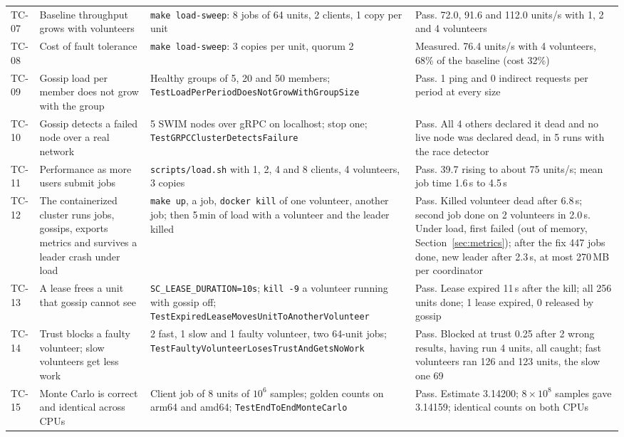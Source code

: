 \begin{table}[t]
\begin{tabular}{@{}lp{}p{}p{}@{}}
TC-07 & Baseline throughput grows with volunteers & \texttt{make load-sweep}: 8 jobs of 64 units, 2 clients, 1 copy per unit & Pass. 72.0, 91.6 and 112.0 units/s with 1, 2 and 4 volunteers \\
TC-08 & Cost of fault tolerance & \texttt{make load-sweep}: 3 copies per unit, quorum 2 & Measured. 76.4 units/s with 4 volunteers, 68\% of the baseline (cost 32\%) \\
TC-09 & Gossip load per member does not grow with the group & Healthy groups of 5, 20 and 50 members; \texttt{TestLoadPerPeriod\allowbreak DoesNotGrowWithGroupSize} & Pass. 1 ping and 0 indirect requests per period at every size \\
TC-10 & Gossip detects a failed node over a real network & 5 SWIM nodes over gRPC on localhost; stop one; \texttt{TestGRPCClusterDetectsFailure} & Pass. All 4 others declared it dead and no live node was declared dead, in 5 runs with the race detector \\
TC-11 & Performance as more users submit jobs & \texttt{scripts/load.sh} with 1, 2, 4 and 8 clients, 4 volunteers, 3 copies & Pass. 39.7 rising to about 75 units/s; mean job time 1.6\,s to 4.5\,s \\
TC-12 & The containerized cluster runs jobs, gossips, exports metrics and survives a leader crash under load & \texttt{make up}, a job, \texttt{docker kill} of one volunteer, another job; then 5\,min of load with a volunteer and the leader killed & Pass. Killed volunteer dead after 6.8\,s; second job done on 2 volunteers in 2.0\,s. Under load, first failed (out of memory, Section~\ref{sec:metrics}); after the fix 447 jobs done, new leader after 2.3\,s, at most 270\,MB per coordinator \\
TC-13 & A lease frees a unit that gossip cannot see & \texttt{SC\_LEASE\_DURATION=10s}; \texttt{kill -9} a volunteer running with gossip off; \texttt{TestExpiredLeaseMoves\allowbreak UnitToAnotherVolunteer} & Pass. Lease expired 11\,s after the kill; all 256 units done; 1 lease expired, 0 released by gossip \\
TC-14 & Trust blocks a faulty volunteer; slow volunteers get less work & 2 fast, 1 slow and 1 faulty volunteer, two 64-unit jobs; \texttt{TestFaultyVolunteerLosesTrust\allowbreak AndGetsNoWork} & Pass. Blocked at trust 0.25 after 2 wrong results, having run 4 units, all caught; fast volunteers ran 126 and 123 units, the slow one 69 \\
TC-15 & Monte Carlo is correct and identical across CPUs & Client job of 8 units of $10^6$ samples; golden counts on arm64 and amd64; \texttt{TestEndToEndMonteCarlo} & Pass. Estimate 3.14200; $8\times10^8$ samples gave 3.14159; identical counts on both CPUs \\

\end{tabular}
\end{table}
